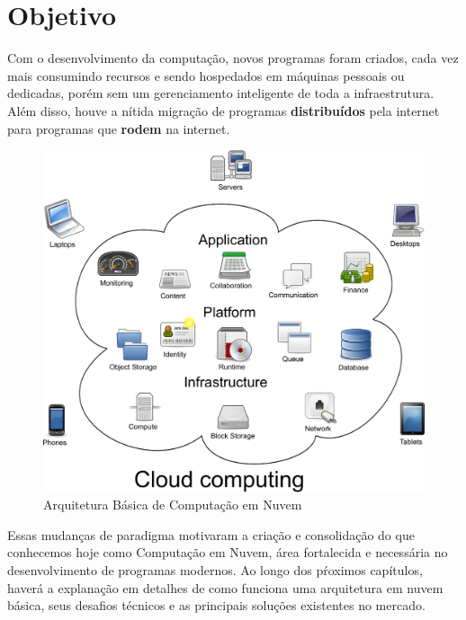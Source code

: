 \chapter{Objetivo}

Com o desenvolvimento da computação, novos programas foram criados, cada vez mais consumindo recursos e sendo hospedados em máquinas pessoais ou dedicadas, porém sem um gerenciamento inteligente de toda a infraestrutura. Além disso, houve a nítida migração de programas \textbf{distribuídos} pela internet para programas que \textbf{rodem} na internet.

\begin{figure}[h!]
  \centering
  \includegraphics[scale=0.40]{imagens/cloud_computing.eps}
  \caption{Arquitetura Básica de Computação em Nuvem\cite{cloudcomputing}}
\end{figure}

Essas mudanças de paradigma motivaram a criação e consolidação do que conhecemos hoje como Computação em Nuvem, área fortalecida e necessária no desenvolvimento de programas modernos. Ao longo dos pŕoximos capítulos, haverá a explanação em detalhes de como funciona uma arquitetura em nuvem básica, seus desafios técnicos e as principais soluções existentes no mercado.
